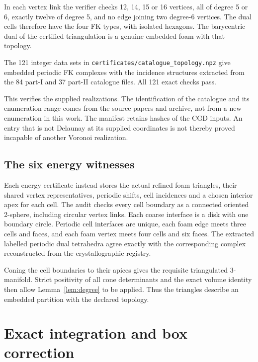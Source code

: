 \documentclass[11pt,a4paper]{report}
\begin{document}
In each vertex link the verifier checks 12, 14, 15 or 16 vertices, all of
degree 5 or 6, exactly twelve of degree 5, and no edge joining two
degree-6 vertices. The dual cells therefore have the four FK types, with
isolated hexagons. The barycentric dual of the certified triangulation is
a genuine embedded foam with that topology.

\begin{theorem}\label{thm:catalogue}
The 121 integer data sets in
\texttt{certificates/catalogue\_topology.npz} give embedded periodic FK
complexes with the incidence structures extracted from the 84 part-I and
37 part-II catalogue files. All 121 exact checks pass.
\end{theorem}

This verifies the supplied realizations. The identification of the
catalogue and its enumeration range comes from the source papers and
archive\autocite{Dutour2010,Dutour2012,CatalogueData}, not from a new
enumeration in this work. The manifest retains hashes of the CGD inputs.
An entry that is not Delaunay at its supplied coordinates is not thereby
proved incapable of another Voronoi realization.

\subsection{The six energy witnesses}

Each energy certificate instead stores the actual refined foam triangles,
their shared vertex representatives, periodic shifts, cell incidences and
a chosen interior apex for each cell. The audit checks every cell boundary
as a connected oriented 2-sphere, including circular vertex links. Each
coarse interface is a disk with one boundary circle. Periodic cell
interfaces are unique, each foam edge meets three cells and faces, and
each foam vertex meets four cells and six faces. The extracted labelled
periodic dual tetrahedra agree exactly with the corresponding complex
reconstructed from the crystallographic registry.

Coning the cell boundaries to their apices gives the requisite triangulated
3-manifold. Strict positivity of all cone determinants and the exact
volume identity then allow Lemma~\ref{lem:degree} to be applied. Thus the
triangles describe an embedded partition with the declared topology.

\section{Exact integration and box correction}
\end{document}
